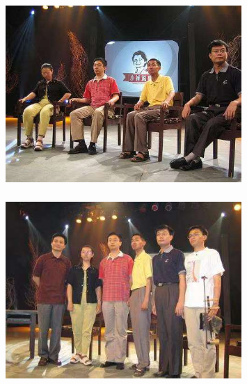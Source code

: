 \documentclass[cjk,slidestop,compress,mathserif,blue]{beamer}
\begin{document}
\frame
{
	\frametitle{}
\begin{figure}[h!]
\centering
\vspace{-0.05in}
\includegraphics[height=0.60\textwidth,width=0.8\textwidth,clip]{Figures_Peking-Opera/PekOpe_Cui-1.jpg}
\label{Cui-1}
\end{figure}
}

\frame
{
	\frametitle{}
\begin{figure}[h!]
\centering
\vspace{-0.05in}
\includegraphics[height=0.60\textwidth,width=0.8\textwidth,clip]{Figures_Peking-Opera/PekOpe_Cui-2.jpg}
\label{Cui-2}
\end{figure}
\fontsize{6.0pt}{5.2pt}
}
\end{document}
